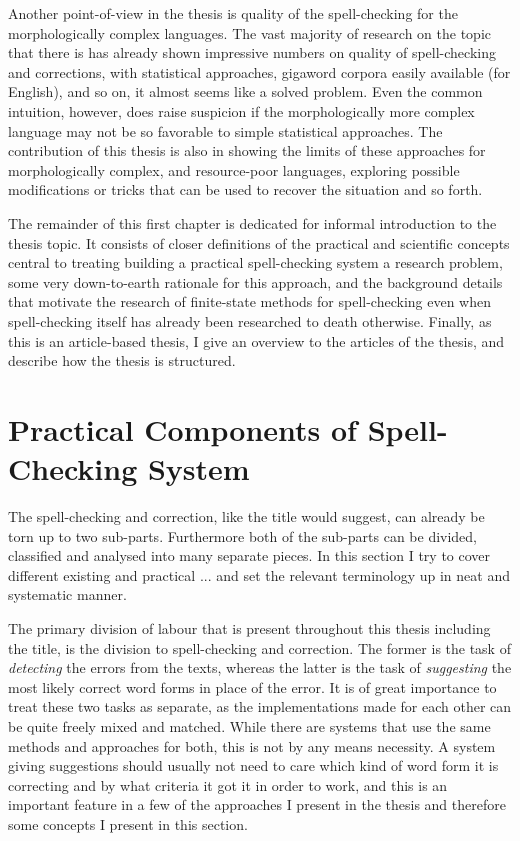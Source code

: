 \documentclass[officiallayout]{unihelcompling}
\begin{document}
Another point-of-view in the thesis is quality of the spell-checking for the
morphologically complex languages. The vast majority of research on the topic
that there is has already shown impressive numbers on quality of spell-checking
and corrections, with statistical approaches, gigaword corpora easily available
(for English), and so on, it almost seems like a solved problem. Even the
common intuition, however, does raise suspicion if the morphologically more
complex language may not be so favorable to simple statistical approaches. The
contribution of this thesis is also in showing the limits of these approaches
for morphologically complex, and resource-poor languages, exploring possible
modifications or tricks that can be used to recover the situation and so forth.

The remainder of this first chapter is dedicated for informal introduction to
the thesis topic. It consists of closer definitions of the practical and
scientific concepts central to treating building a practical spell-checking
system a research problem, some very down-to-earth rationale for this approach,
and the background details that motivate the research of finite-state methods
for spell-checking even when spell-checking itself has already been researched
to death otherwise. Finally, as this is an article-based thesis, I give an
overview to the articles of the thesis, and describe how the thesis is
structured.

\section{Practical Components of Spell-Checking System}
\label{sec:practical-components}

The spell-checking and correction, like the title would suggest, can already
be torn up to two sub-parts. Furthermore both of the sub-parts can be divided,
classified and analysed into many separate pieces. In this section I try to
cover different existing and practical ... and set the relevant terminology up
in neat and systematic manner.

The primary division of labour that is present throughout this thesis including
the title, is the division to spell-checking and correction. The former is the
task of \emph{detecting} the errors from the texts, whereas the latter is the
task of \emph{suggesting} the most likely correct word forms in place of the
error. It is of great importance to treat these two tasks as separate, as the
implementations made for each other can be quite freely mixed and matched.
While there are systems that use the same methods and approaches for both,
this is not by any means necessity. A system giving suggestions should usually
not need to care which kind of word form it is correcting and by what criteria
it got it in order to work, and this is an important feature in a few of the
approaches I present in the thesis and therefore some concepts I present in
this section.
\end{document}
